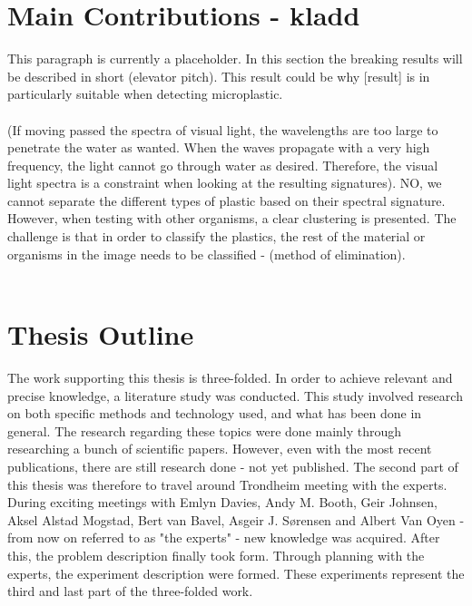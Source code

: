 \section{Main Contributions - kladd} This paragraph is currently a placeholder. In this section the breaking results will be described in short (elevator pitch). This result could be why [result] is in particularly suitable when detecting microplastic.
\\\\
(If moving passed the spectra of visual light, the wavelengths are too large to penetrate the water as wanted. When the waves propagate with a very high frequency, the light cannot go through water as desired. Therefore, the visual light spectra is a constraint when looking at the resulting signatures). NO, we cannot separate the different types of plastic based on their spectral signature. However, when testing with other organisms, a clear clustering is presented. The challenge is that in order to classify the plastics, the rest of the material or organisms in the image needs to be classified - (method of elimination). 
\\\\
\section{Thesis Outline}
The work supporting this thesis is three-folded. In order to achieve relevant and precise knowledge, a literature study was conducted. This study involved research on both specific methods and technology used, and what has been done in general. The research regarding these topics were done mainly through researching a bunch of scientific papers. However, even with the most recent publications, there are still research done - not yet published. The second part of this thesis was therefore to travel around Trondheim meeting with the experts. During exciting meetings with Emlyn Davies, Andy M. Booth, Geir Johnsen, Aksel Alstad Mogstad, Bert van Bavel, Asgeir J. S{\o}rensen and Albert Van Oyen - from now on referred to as "the experts" - new knowledge was acquired. After this, the problem description finally took form. Through planning with the experts, the experiment description were formed. These experiments represent the third and last part of the three-folded work. 



